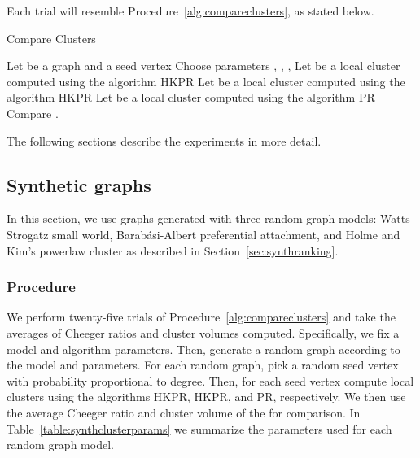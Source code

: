 \documentclass[runningheads,a4paper]{llncs}
\begin{document}
Each trial will resemble Procedure~\ref{alg:compareclusters}, as stated below.

\begin{algorithm}[H]
\caption{Compare Clusters}
\label{alg:compareclusters}
\begin{algorithmic}
\State Let  be a graph and  a seed vertex
\State Choose parameters , , , 
\State Let  be a local cluster computed using the algorithm HKPR
\State Let  be a local cluster computed using the algorithm HKPR
\State Let  be a local cluster computed using the algorithm PR
\State Compare .
\end{algorithmic}
\end{algorithm}

The following sections describe the experiments in more detail.

\subsection{Synthetic graphs}
In this section, we use graphs generated with three random graph models:
Watts-Strogatz small world, Barab\'{a}si-Albert preferential attachment, and
Holme and Kim's powerlaw cluster as described in Section~\ref{sec:synthranking}.

\subsubsection{Procedure} We perform twenty-five trials of
Procedure~\ref{alg:compareclusters} and take the averages of Cheeger ratios and
cluster volumes computed.  Specifically, we fix a model and algorithm
parameters.  Then, generate a random graph according to the model and
parameters.  For each random graph, pick a random seed vertex with probability
proportional to degree.  Then, for each seed vertex compute local clusters  using the algorithms HKPR, HKPR, and PR, respectively.  We
then use the average Cheeger ratio and cluster volume of the  for
comparison.  In Table~\ref{table:synthclusterparams} we summarize the parameters
used for each random graph model.
\end{document}
